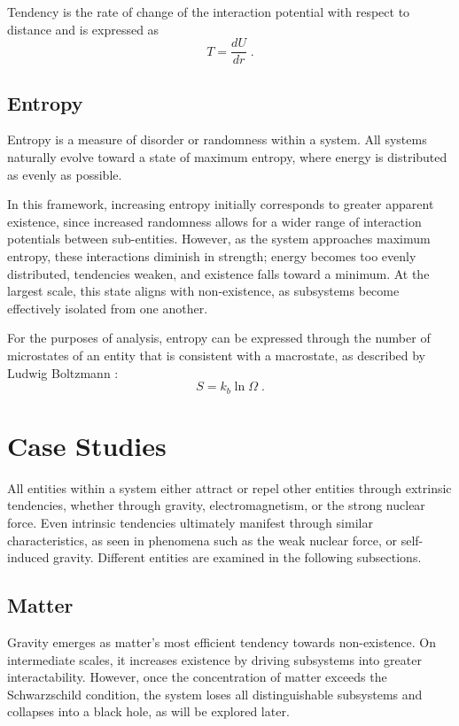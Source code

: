 \documentclass{article}
\begin{document}
Tendency is the rate of change of the interaction potential with respect to distance and is expressed as
\[
    T = \frac{dU}{dr}\;.
\]


\subsection{Entropy}

Entropy is a measure of disorder or randomness within a system. 
All systems naturally evolve toward a state of maximum entropy, where energy is distributed as evenly as possible. 

In this framework, increasing entropy initially corresponds to greater apparent existence, since increased randomness allows for a wider range of interaction potentials between sub-entities. 
However, as the system approaches maximum entropy, these interactions diminish in strength; energy becomes too evenly distributed, tendencies weaken, and existence falls toward a minimum. 
At the largest scale, this state aligns with non-existence, as subsystems become effectively isolated from one another.

For the purposes of analysis, entropy can be expressed through the number of microstates of an entity that is consistent with a macrostate, as described by Ludwig Boltzmann \cite{BoltzmannTranslation2015}:
\[
    S = k_b \ln \Omega\;.
\]



\newpage
\section{Case Studies}

All entities within a system either attract or repel other entities through extrinsic tendencies, whether through gravity, electromagnetism, or the strong nuclear force. 
Even intrinsic tendencies ultimately manifest through similar characteristics, as seen in phenomena such as the weak nuclear force, or self-induced gravity. 
Different entities are examined in the following subsections.


\subsection{Matter}

Gravity emerges as matter's most efficient tendency towards non-existence. 
On intermediate scales, it increases existence by driving subsystems into greater interactability. 
However, once the concentration of matter exceeds the Schwarzschild condition, the system loses all distinguishable subsystems and collapses into a black hole, as will be explored later.
\end{document}
